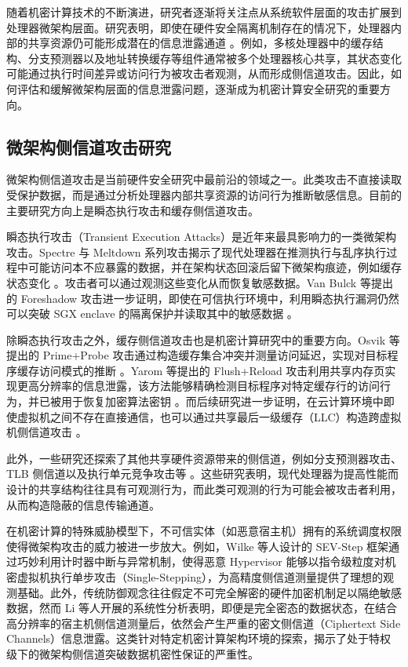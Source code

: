 随着机密计算技术的不断演进，研究者逐渐将关注点从系统软件层面的攻击扩展到处理器微架构层面。研究表明，即使在硬件安全隔离机制存在的情况下，处理器内部的共享资源仍可能形成潜在的信息泄露通道 \cite{ge2018survey,lou2022survey}。例如，多核处理器中的缓存结构、分支预测器以及地址转换缓存等组件通常被多个处理器核心共享，其状态变化可能通过执行时间差异或访问行为被攻击者观测，从而形成侧信道攻击。因此，如何评估和缓解微架构层面的信息泄露问题，逐渐成为机密计算安全研究的重要方向。

\subsection{微架构侧信道攻击研究}
微架构侧信道攻击是当前硬件安全研究中最前沿的领域之一。此类攻击不直接读取受保护数据，而是通过分析处理器内部共享资源的访问行为推断敏感信息。目前的主要研究方向上是瞬态执行攻击和缓存侧信道攻击。

瞬态执行攻击（Transient Execution Attacks）是近年来最具影响力的一类微架构攻击。Spectre 与 Meltdown 系列攻击揭示了现代处理器在推测执行与乱序执行过程中可能访问本不应暴露的数据，并在架构状态回滚后留下微架构痕迹，例如缓存状态变化 \cite{kocher2020spectre,lipp2018meltdown}。攻击者可以通过观测这些变化从而恢复敏感数据。Van Bulck 等提出的 Foreshadow 攻击进一步证明，即使在可信执行环境中，利用瞬态执行漏洞仍然可以突破 SGX enclave 的隔离保护并读取其中的敏感数据 \cite{bulck2018foreshadow}。

除瞬态执行攻击之外，缓存侧信道攻击也是机密计算研究中的重要方向。Osvik 等提出的 Prime+Probe 攻击通过构造缓存集合冲突并测量访问延迟，实现对目标程序缓存访问模式的推断 \cite{osvik2006cache}。Yarom 等提出的 Flush+Reload 攻击利用共享内存页实现更高分辨率的信息泄露，该方法能够精确检测目标程序对特定缓存行的访问行为，并已被用于恢复加密算法密钥 \cite{yarom2014flushreload}。而后续研究进一步证明，在云计算环境中即使虚拟机之间不存在直接通信，也可以通过共享最后一级缓存（LLC）构造跨虚拟机侧信道攻击 \cite{ristenpart2009hey}。

此外，一些研究还探索了其他共享硬件资源带来的侧信道，例如分支预测器攻击、TLB 侧信道以及执行单元竞争攻击等 \cite{gruss2016flushflush,lou2022survey}。这些研究表明，现代处理器为提高性能而设计的共享结构往往具有可观测行为，而此类可观测的行为可能会被攻击者利用，从而构造隐蔽的信息传输通道。

在机密计算的特殊威胁模型下，不可信实体（如恶意宿主机）拥有的系统调度权限使得微架构攻击的威力被进一步放大。例如，Wilke 等人设计的 SEV-Step 框架通过巧妙利用计时器中断与异常机制，使得恶意 Hypervisor 能够以指令级粒度对机密虚拟机执行单步攻击（Single-Stepping）\cite{wilke2024sevstep}，为高精度侧信道测量提供了理想的观测基础。此外，传统防御观念往往假定不可完全解密的硬件加密机制足以隔绝敏感数据，然而 Li 等人开展的系统性分析表明，即便是完全密态的数据状态，在结合高分辨率的宿主机侧信道测量后，依然会产生严重的密文侧信道（Ciphertext Side Channels）信息泄露\cite{li2022systematic}。这类针对特定机密计算架构环境的探索，揭示了处于特权级下的微架构侧信道突破数据机密性保证的严重性。

